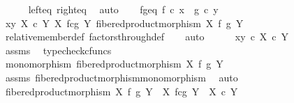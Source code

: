 \begin{isabellebody}
\ \ \ \ \isamarkupfalse%
\ left{\isacharunderscore}{\kern0pt}eq\ right{\isacharunderscore}{\kern0pt}eq\ \isamarkupfalse%
\ auto\isanewline
{}\isamarkupfalse%
\isanewline
\ \ \isamarkupfalse%
\ f{\isacharunderscore}{\kern0pt}g{\isacharunderscore}{\kern0pt}eq{\isacharcolon}{\kern0pt}\ {\isachardoublequoteopen}f\ {\isasymcirc}\isactrlsub c\ x\ {\isacharequal}{\kern0pt}\ g\ {\isasymcirc}\isactrlsub c\ y{\isachardoublequoteclose}\isanewline
\ \ \isamarkupfalse%
\ {\isachardoublequoteopen}{\isasymlangle}x{\isacharcomma}{\kern0pt}y{\isasymrangle}\ {\isasymin}\isactrlbsub X\ {\isasymtimes}\isactrlsub c\ Y\isactrlesub \ {\isacharparenleft}{\kern0pt}X\ \isactrlbsub f\isactrlesub {\isasymtimes}\isactrlsub c\isactrlbsub g\isactrlesub \ Y{\isacharcomma}{\kern0pt}\ fibered{\isacharunderscore}{\kern0pt}product{\isacharunderscore}{\kern0pt}morphism\ X\ f\ g\ Y{\isacharparenright}{\kern0pt}{\isachardoublequoteclose}\isanewline
\ \ \ \ \isamarkupfalse%
\ relative{\isacharunderscore}{\kern0pt}member{\isacharunderscore}{\kern0pt}def\ factors{\isacharunderscore}{\kern0pt}through{\isacharunderscore}{\kern0pt}def\isanewline
\ \ \isamarkupfalse%
\ auto\isanewline
\ \ \ \ \isamarkupfalse%
\ {\isachardoublequoteopen}{\isasymlangle}x{\isacharcomma}{\kern0pt}y{\isasymrangle}\ {\isasymin}\isactrlsub c\ X\ {\isasymtimes}\isactrlsub c\ Y{\isachardoublequoteclose}\isanewline
\ \ \ \ \ \ \isamarkupfalse%
\ assms\ \isamarkupfalse%
\ typecheck{\isacharunderscore}{\kern0pt}cfuncs\isanewline
\ \ \ \ \isamarkupfalse%
\ {\isachardoublequoteopen}monomorphism\ {\isacharparenleft}{\kern0pt}fibered{\isacharunderscore}{\kern0pt}product{\isacharunderscore}{\kern0pt}morphism\ X\ f\ g\ Y{\isacharparenright}{\kern0pt}{\isachardoublequoteclose}\isanewline
\ \ \ \ \ \ \isamarkupfalse%
\ assms{\isacharparenleft}{\kern0pt}{}{\isacharcomma}{\kern0pt}{}{\isacharparenright}{\kern0pt}\ fibered{\isacharunderscore}{\kern0pt}product{\isacharunderscore}{\kern0pt}morphism{\isacharunderscore}{\kern0pt}monomorphism\ \isamarkupfalse%
\ auto\isanewline
\ \ \ \ \isamarkupfalse%
\ {\isachardoublequoteopen}fibered{\isacharunderscore}{\kern0pt}product{\isacharunderscore}{\kern0pt}morphism\ X\ f\ g\ Y\ {\isacharcolon}{\kern0pt}\ X\ \isactrlbsub f\isactrlesub {\isasymtimes}\isactrlsub c\isactrlbsub g\isactrlesub \ Y\ {\isasymrightarrow}\ X\ {\isasymtimes}\isactrlsub c\ Y{\isachardoublequoteclose}\isanewline

\end{isabellebody}
